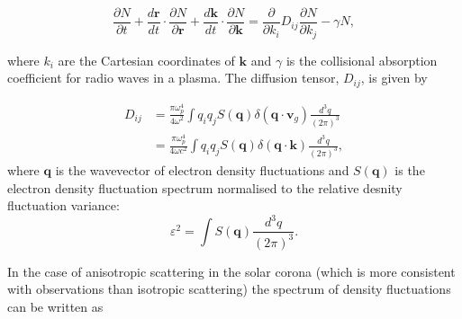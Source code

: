\begin{equation}
\label{eq:scattering_Fokker_Planck}
\frac{\partial N}{\partial t} +\frac{d \mathbf{r}}{dt} \cdot \frac{\partial N}{\partial \mathbf{r}} + \frac{d \mathbf{k}}{dt} \cdot \frac{\partial N}{\partial \mathbf{k}} = \frac{\partial}{\partial k_i} D_{ij} \frac{\partial N}{\partial k_j} - \gamma N,
\end{equation}

where $k_i$ are the Cartesian coordinates of $\mathbf{k}$ and $\gamma$ is the collisional absorption coefficient for radio waves in a plasma. The diffusion tensor, $D_{ij}$, is given by

\begin{equation}
\label{eq:scattering_diffusion_tensor}
\begin{aligned}
D_{ij} &= \frac{\pi \omega_p^4}{4 \omega^2} \int q_i q_j S(\mathbf{q}) \delta(\mathbf{q} \cdot \mathbf{v}_g) \frac{d^3 q}{(2 \pi)^3} \\
&= \frac{\pi \omega_p^4}{4 \omega c^2} \int q_i q_j S(\mathbf{q}) \delta(\mathbf{q} \cdot \mathbf{k}) \frac{d^3 q}{(2 \pi)^3},
\end{aligned}
\end{equation}
where $\mathbf{q}$ is the wavevector of electron density fluctuations and $S(\mathbf{q})$ is the electron density fluctuation spectrum normalised to the relative desnity fluctuation variance:
\begin{equation}
\varepsilon^2 = \int S(\mathbf{q})  \frac{d^3 q}{(2 \pi)^3}.
\end{equation}

In the case of anisotropic scattering in the solar corona (which is more consistent with observations than isotropic scattering) the spectrum of density fluctuations can be written as

